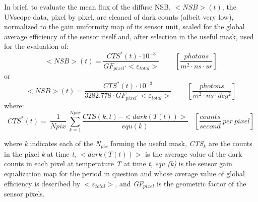 In brief,  to evaluate the mean flux of the diffuse NSB, \textit{$<NSB>(t)$}, the UVscope data, pixel by pixel, are cleaned of dark counts (albeit very low), normalized to the gain uniformity map of its sensor unit, scaled for the global average efficiency of the sensor itself and, after selection in the useful mask, used for the evaluation of:\\

\noindent
\[<NSB>\left(t\right)=\frac{{CTS}^*(t)\cdot {10}^{-3}}{{GF}_{pixel}\cdot <{\varepsilon }_{total}>}\ \ \ \ \ \ \ \ \ \ \left[\frac{photons}{m^2\cdot ns\cdot sr}\right]\]
or
\[<NSB>\left(t\right)=\frac{{CTS}^*(t)\cdot {10}^{-3}}{{3282.778}\cdot {GF}_{pixel}\cdot <{\varepsilon }_{total}>}\ \ \ \ \ \ \ \ \ \ \left[\frac{photons}{m^2\cdot ns\cdot deg^2}\right]\]
where:
\[{CTS}^*\left(t\right)=\ \frac{1}{Npix}\ \sum^{Npix}_{k=1}{\frac{CTS\left(k,t\right)-<dark(T\left(t\right))>}{equ(k)}}\ \ \ \ \left[\frac{counts}{second}\ per\ pixel\right]\]

\noindent where \textit{k} indicates each of the \textit{N${}_{pix}$ }forming the useful mask, \textit{CTS${}_{k}$} are the counts in the pixel \textit{k} at time \textit{t}, \textit{$<dark(T(t))>$} is the average value of the dark counts in each pixel at temperature \textit{T} at time \textit{t}, \textit{equ (k)} is the sensor gain equalization map for the period in question and whose average value of global efficiency is described by \textit{$<\varepsilon{}_{total}>$}, and  \textit{GF${}_{pixel}$} is the geometric factor of the sensor pixels.
